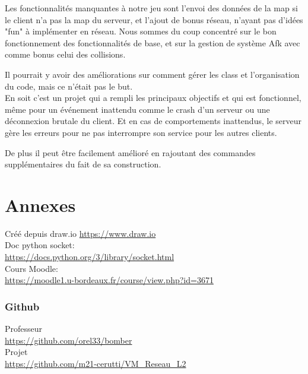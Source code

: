 \documentclass[a4paper]{article}
\begin{document}
	Les fonctionnalités manquantes à notre jeu sont l'envoi des données de la map si le client n'a pas la map du serveur, et l'ajout de bonus réseau, n'ayant pas d'idées "fun" à implémenter en réseau. Nous sommes du coup concentré sur le bon fonctionnement des fonctionnalités de base, et sur la gestion de système Afk avec comme bonus celui des collisions.

	Il pourrait y avoir des améliorations sur comment gérer les class et l'organisation du code, mais ce n'était pas le but.
	\\

	En soit c'est un projet qui a rempli les principaux objectifs et qui est fonctionnel, même pour un événement inattendu comme le crash d'un serveur ou une déconnexion brutale du client. Et en cas de comportements inattendus, le serveur gère les erreurs pour ne pas interrompre son service pour les autres clients.

	De plus il peut être facilement amélioré en rajoutant des commandes supplémentaires du fait de sa construction.


\newpage
\appendix
\part{Annexes}

\listoffigures

Créé depuis draw.io
\href{https://www.draw.io}{https://www.draw.io}
\\

Doc python socket:\label{docpysoc}
\\
\href{https://docs.python.org/3/library/socket.html}{https://docs.python.org/3/library/socket.html}
\\

Cours Moodle: \label{moodle}
\\
\href{https://moodle1.u-bordeaux.fr/course/view.php?id=3671}{https://moodle1.u-bordeaux.fr/course/view.php?id=3671}

\section{Github} \label{github}

Professeur
\\
\href{https://github.com/orel33/bomber}{https://github.com/orel33/bomber}
\\

Projet
\\
\href{https://github.com/m21-cerutti/VM_Reseau_L2}{https://github.com/m21-cerutti/VM\_Reseau\_L2}
\\
\end{document}
